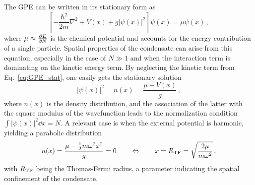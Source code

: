 The GPE can be written in its stationary form as
\begin{equation}
    \left[ 
        -\frac{\hbar^2}{2m}\nabla^2 + V(x) + g|\psi(x)|^2
    \right] \psi(x) = \mu \psi(x)\, ,
    \label{eq:GPE_stat}
\end{equation}
where $\mu \approx \pdv{E}{N}$ is the chemical potential and accounts for the energy contribution of a single particle. Spatial properties of the condensate can arise from this equation, especially in the case of $N \gg 1$ and when the interaction term is dominating on the kinetic energy term. By neglecting the kinetic term from Eq.\ \eqref{eq:GPE_stat}, one easily gets the stationary solution
\[
    |\psi(x)|^2 = n(x) = \frac{\mu - V(x)}{g}\, ,
\]
where $n(x)$ is the density distribution, and the association of the latter with the square modulus of the wavefunction leads to the normalization condition $\int |\psi(x)|^2 \dd x = N$. A relevant case is when the external potential is harmonic, yielding a parabolic distribution
\begin{equation}
    n(x) = \frac{\mu - \frac{1}{2}m\omega^2x^2}{g} = 0 \qquad
    \Leftrightarrow \qquad
    x = R_{\rm TF} = \sqrt{\frac{2\mu}{m\omega^2}}\, ,
    \label{eq:TF}
\end{equation}
with $R_{\rm TF}$ being the Thomas-Fermi radius, a parameter indicating the spatial confinement of the condensate.



